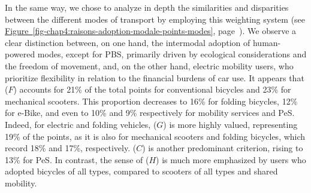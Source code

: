 \begin{refsegment}
In the same way, we chose to analyze in depth the similarities and disparities between the different modes of transport by employing this weighting system (see \hyperref[fig-chap4:raisons-adoption-modale-points-modes]{Figure~\ref{fig-chap4:raisons-adoption-modale-points-modes}}, page~\pageref{fig-chap4:raisons-adoption-modale-points-modes}). We observe a clear distinction between, on one hand, the intermodal adoption of human-powered modes, except for \acrshort{PBS}, primarily driven by ecological considerations and the freedom of movement, and, on the other hand, electric mobility users, who prioritize flexibility in relation to the financial burdens of car use. It appears that  (\(F\)) accounts for 21\% of the total points for conventional bicycles and 23\% for mechanical scooters. This proportion decreases to 16\% for folding bicycles, 12\% for \acrshort{e-Bike}, and even to 10\% and 9\% respectively for mobility services and \acrshort{PeS}. Indeed, for electric and folding vehicles,  (\(G\)) is more highly valued, representing 19\% of the points, as it is also for mechanical scooters and folding bicycles, which record 18\% and 17\%, respectively.  (\(C\)) is another predominant criterion, rising to 13\% for \acrshort{PeS}. In contrast, the sense of  (\(H\)) is much more emphasized by users who adopted bicycles of all types, compared to scooters of all types and shared mobility.%


\end{refsegment}
